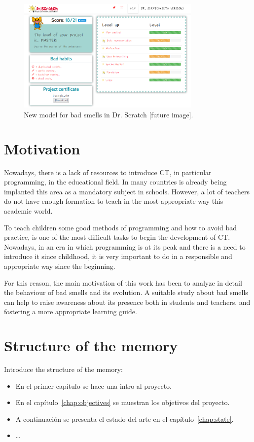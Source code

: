 \begin{figure}
  \centering
  \includegraphics[width=9cm, keepaspectratio]{img/dashboards.png}
  \caption{New model for bad smells in Dr. Scratch [future image].}
  \label{fig:bad_smells}
\end{figure}



\section{Motivation}
\label{sec:motivation}

Nowadays, there is a lack of resources to introduce CT, in particular programming, in the educational field. In many countries is already being implanted this area as a mandatory subject in schools. However, a lot of teachers do not have enough formation to teach in the most appropriate way this academic world. 

To teach children some good methods of programming and how to avoid bad practice, is one of the most difficult tasks to begin the development of CT. Nowadays, in an era in which programming is at its peak and there is a need to introduce it since childhood, it is very important to do in a responsible and appropriate way since the beginning. 

For this reason, the main motivation of this work has been to analyze in detail the behaviour of bad smells and its evolution. A suitable study about bad smells can help to raise awareness about its presence both in students and teachers, and fostering a more appropriate learning guide.


\section{Structure of the memory}
\label{sec:structure}

Introduce the structure of the memory:

\begin{itemize}
  \item En el primer capítulo se hace una intro al proyecto.
  
  \item En el capítulo~\ref{chap:objectives} se muestran los objetivos del proyecto.
  
  \item A continuación se presenta el estado del arte en el capítulo~\ref{chap:state}.
  
  \item \ldots
\end{itemize}

